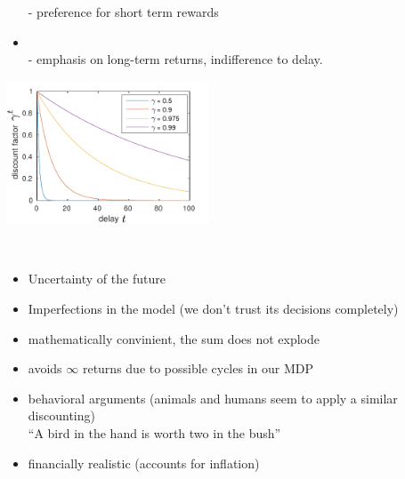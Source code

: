 \begin{frame}
\begin{itemize}
- preference for short term rewards

\item {}\\

- emphasis on long-term returns, indifference to delay.

\end{itemize}


\begin{center}
\includegraphics[width=6cm]{img/delay_discount}
\label{fig:discount}
\end{center}

\end{frame}

\begin{frame}

\\

\begin{itemize}
\item Uncertainty of the future
\item Imperfections in the model (we don't trust its decisions completely)
\item mathematically convinient, the sum does not explode
\item avoids $\infty$ returns due to possible cycles in our MDP
\item behavioral arguments (animals and humans seem to apply a similar discounting)\\
``A bird in the hand is worth two in the bush''
\item financially realistic (accounts for inflation)
\end{itemize}

\citep{sutton1998introduction}

\end{frame} 

